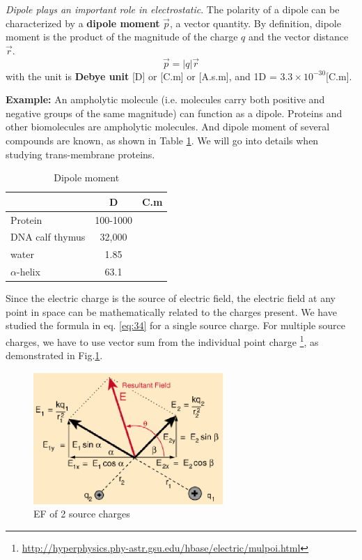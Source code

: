 {\it Dipole plays an important role in electrostatic}. The polarity of
a dipole can be characterized by a {\bf dipole moment} $\vec{p}$, a
vector quantity.  By definition, dipole moment is the product of the
magnitude of the charge $q$ and the vector distance $\vec{r}$.
\begin{equation}
  \vec{p} = |q|\vec{r}
\end{equation}
with the unit is {\bf Debye unit} [D] or [C.m] or [A.s.m], and 1D =
$3.3\times10^{-30}$[C.m].

{\bf Example:} An ampholytic molecule (i.e. molecules carry both
positive and negative groups of the same magnitude) can function as a
dipole. Proteins and other biomolecules are ampholytic molecules. And
dipole moment of several compounds are known, as shown in Table
\ref{tab:Dipole_moment}. We will go into details when studying
trans-membrane proteins. 
\begin{table}[hbt]
\begin{center}
  \begin{tabular}[]{lcc}
    \hline
    & D & C.m\\
    \hline\hline
    Protein & 100-1000 & \\
    DNA calf thymus & 32,000 & \\
    water & 1.85 & \\
    $\alpha$-helix & 63.1 & \\
    \hline
  \end{tabular}
\end{center}
\caption{Dipole moment}
\label{tab:Dipole_moment}
\end{table}

Since the electric charge is the source of electric field, the
electric field at any point in space can be mathematically related to
the charges present. We have studied the formula in eq. \eqref{eq:34}
for a single source charge. For multiple source charges, we have to
use vector sum from the individual point charge
\footnote{\url{http://hyperphysics.phy-astr.gsu.edu/hbase/electric/mulpoi.html}},
as demonstrated in Fig.\ref{fig:EF-multiple-source}.

  \begin{figure}[htb]
    \centerline{\includegraphics[height=5cm]{./images/electric_field-multiple_source_charge.eps}}
    \caption{EF of 2 source charges}\label{fig:EF-multiple-source}
  \end{figure}

